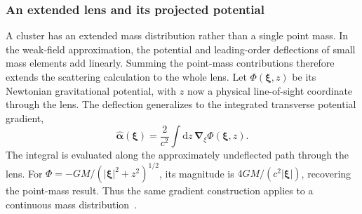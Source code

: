 \subsubsection{An extended lens and its projected potential}


A cluster has an extended mass distribution rather than a single point mass. In the weak-field approximation, the potential and leading-order deflections of small mass elements add linearly. Summing the point-mass contributions therefore extends the scattering calculation to the whole lens. Let $\Phi(\boldsymbol{\xi},z)$ be its Newtonian gravitational potential, with $z$ now a physical line-of-sight coordinate through the lens. The deflection generalizes to the integrated transverse potential gradient,
\begin{equation}
    \widehat{\boldsymbol{\alpha}}(\boldsymbol{\xi})
    =\frac{2}{c^2}\int \mathrm{d}z\,\boldsymbol{\nabla}_{\xi}\Phi(\boldsymbol{\xi},z).
    \label{eq:potential-deflection}
\end{equation}
The integral is evaluated along the approximately undeflected path through the lens. For $\Phi=-GM/(|\boldsymbol{\xi}|^2+z^2)^{1/2}$, its magnitude is $4GM/(c^2|\boldsymbol{\xi}|)$, recovering the point-mass result. Thus the same gradient construction applies to a continuous mass distribution~\cite{yoo_weak_2026,bartelmann_weak_2001}.

